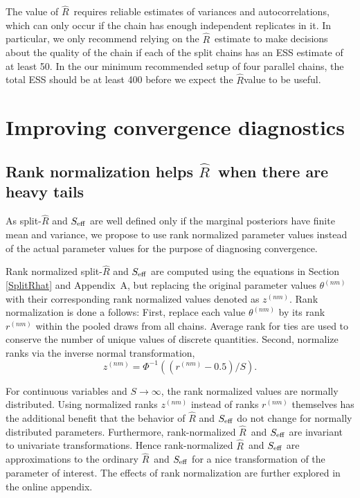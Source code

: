 \documentclass[american,]{article}
\newcommand{\Rhat}{$\widehat{R}$}
\theoremstyle{definition}
\begin{document}
The value of \Rhat\ requires reliable estimates of variances and autocorrelations, which can
only occur if the chain has enough independent replicates in it. In particular, we only recommend 
relying on the \Rhat\ estimate to make decisions about the quality of the chain if each of the 
split chains has an ESS estimate of at least 50. In the our minimum recommended setup of four
parallel chains, the total ESS should be at least 400 before we expect the \Rhat value to be useful.


\hypertarget{improving-convergence-diagnostics}{%
\section{Improving convergence
diagnostics}\label{improving-convergence-diagnostics}}

\hypertarget{rank-normalization}{%
\subsection{Rank normalization helps  \Rhat\ when there are heavy tails}\label{rank-normalization}}

As split-\(\widehat{R}\) and \(S_{\rm eff}\) are well defined
only if the marginal posteriors have finite mean and variance, we
propose to use rank normalized parameter values instead of the actual
parameter values for the purpose of diagnosing convergence.

Rank normalized split-\(\widehat{R}\) and \(S_{\rm eff}\) are
computed using the equations in Section \ref{SplitRhat} and Appendix~A, but
replacing the original parameter values \(\theta^{(nm)}\) with their
corresponding rank normalized values denoted as \(z^{(nm)}\). Rank
normalization is done a follows: First, replace each value
\(\theta^{(nm)}\) by its rank \(r^{(nm)}\) within the pooled draws from all chains.
 Average rank for ties are
used to conserve the number of unique values of discrete quantities.
 Second, normalize ranks via the inverse normal transformation,
\begin{equation}
z^{(nm)} = \Phi^{-1}((r^{(nm)}-0.5)/S).
\end{equation}

For continuous variables and \(S \rightarrow \infty\), the rank
normalized values are normally distributed. Using normalized ranks
\(z^{(nm)}\) instead of ranks \(r^{(nm)}\) themselves has the additional
benefit that the behavior of \(\widehat{R}\) and \(S_{\rm eff}\) do
not change for normally distributed parameters.  Furthermore, rank-normalized \Rhat\ and \(S_{\rm eff}\) are invariant to univariate transformations. Hence    
rank-normalized \Rhat\ and \(S_{\rm eff}\) are approximations to the ordinary \Rhat\ and \(S_{\rm eff}\) for a nice transformation of the parameter of interest.
The effects of rank normalization are further explored in the online appendix.
\end{document}
